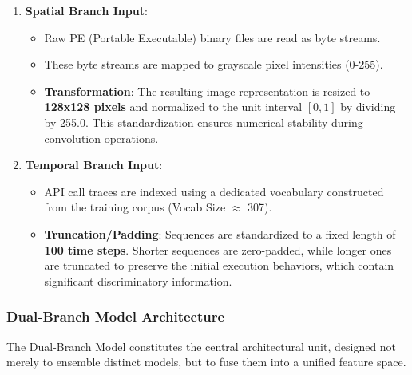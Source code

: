 \begin{enumerate}
    \item \textbf{Spatial Branch Input}:
    \begin{itemize}
        \item Raw PE (Portable Executable) binary files are read as byte streams.
        \item These byte streams are mapped to grayscale pixel intensities (0-255).
        \item \textbf{Transformation}: The resulting image representation is resized to \textbf{128x128 pixels} and normalized to the unit interval $[0, 1]$ by dividing by 255.0. This standardization ensures numerical stability during convolution operations.
    \end{itemize}
    \item \textbf{Temporal Branch Input}:
    \begin{itemize}
        \item API call traces are indexed using a dedicated vocabulary constructed from the training corpus (Vocab Size $\approx$ 307).
        \item \textbf{Truncation/Padding}: Sequences are standardized to a fixed length of \textbf{100 time steps}. Shorter sequences are zero-padded, while longer ones are truncated to preserve the initial execution behaviors, which contain significant discriminatory information.
    \end{itemize}
\end{enumerate}

\subsubsection{Dual-Branch Model Architecture}
The Dual-Branch Model constitutes the central architectural unit, designed not merely to ensemble distinct models, but to fuse them into a unified feature space.

